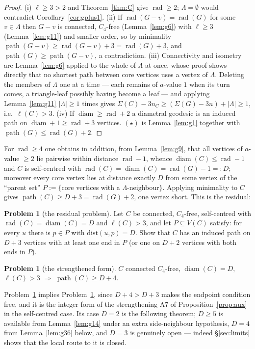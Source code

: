 \documentclass[11pt]{article}
\theoremstyle{plain}
\theoremstyle{definition}
\newtheorem{problem}[theorem]{Problem}
\theoremstyle{remark}
\numberwithin{equation}{section}
\newcommand{\rad}{\operatorname{rad}}
\newcommand{\diam}{\operatorname{diam}}
\newcommand{\pth}{\operatorname{path}}
\begin{document}
\begin{proof}
(i) $\ell \ge 3 > 2$ and Theorem~\ref{thm:C} give $\rad \ge 2$; $\Lambda = \emptyset$ would
contradict Corollary~\ref{cor:gplus1}. (ii) If $\rad(G-v) = \rad(G)$ for some $v \in \Lambda$
then $G - v$ is connected, $C_4$-free (Lemma~\ref{lem:g6}) with $\ell \ge 3$
(Lemma~\ref{lem:g11}) and smaller order, so by minimality
$\pth(G-v) \ge \rad(G-v) + 3 = \rad(G)+3$, and $\pth(G) \ge \pth(G-v)$, a contradiction.
(iii) Connectivity and isometry are Lemma~\ref{lem:g6} applied to the whole of $\Lambda$ at
once, whose proof shows directly that no shortest path between core vertices uses a vertex of
$\Lambda$. Deleting the members of $\Lambda$ one at a time --- each remains of $a$-value $1$
when its turn comes, a triangle-leaf possibly having become a leaf --- and applying
Lemma~\ref{lem:g11} $|\Lambda| \ge 1$ times gives
$\Sigma(C) - 3n_C \ge (\Sigma(G) - 3n) + |\Lambda| \ge 1$, i.e.\ $\ell(C) > 3$.
(iv) If $\diam \ge \rad + 2$ a diametral geodesic is an induced path on
$\diam + 1 \ge \rad + 3$ vertices. $(\star)$ is Lemma~\ref{lem:g1} together with
$\pth(G) \le \rad(G)+2$.
\end{proof}

For $\rad \ge 4$ one obtains in addition, from Lemma~\ref{lem:g9}, that all vertices of
$a$-value $\ge 2$ lie pairwise within distance $\rad - 1$, whence $\diam(C) \le \rad - 1$ and
$C$ is self-centred with $\rad(C) = \diam(C) = \rad(G) - 1 =: D$; moreover every core vertex
lies at distance exactly $D$ from some vertex of the ``parent set''
$P := \{$core vertices with a $\Lambda$-neighbour$\}$. Applying minimality to $C$ gives
$\pth(C) \ge D + 3 = \rad(G)+2$, one vertex short. This is the residual:

\begin{problem}[the residual problem]\label{prob:rp}
Let $C$ be connected, $C_4$-free, self-centred with $\rad(C) = \diam(C) = D$ and
$\ell(C) > 3$, and let $P \subseteq V(C)$ satisfy: for every $u$ there is $p \in P$ with
$\mathrm{dist}(u,p) = D$. Show that $C$ has an induced path on $D+3$ vertices with at least
one end in $P$ (or one on $D+2$ vertices with both ends in $P$).
\end{problem}

\begin{problem}[the strengthened form]\label{prob:rpd}
$C$ connected $C_4$-free, $\diam(C) = D$, $\ell(C) > 3$ $\Longrightarrow$
$\pth(C) \ge D + 4$.
\end{problem}

Problem~\ref{prob:rpd} implies Problem~\ref{prob:rp}, since $D+4 > D+3$ makes the endpoint
condition free, and it is the integer form of the strengthening A7 of
Proposition~\ref{prop:aux} in the self-centred case. Its case $D = 2$ is the following
theorem; $D \ge 5$ is available from Lemma~\ref{lem:g14} under an extra side-neighbour
hypothesis, $D = 4$ from Lemma~\ref{lem:g36} below, and $D = 3$ is genuinely open --- indeed
\S\ref{sec:limits} shows that the local route to it is closed.
\end{document}
